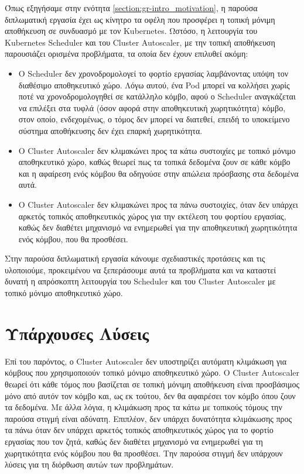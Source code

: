 Όπως εξηγήσαμε στην ενότητα \ref{section:gr-intro_motivation}, η παρούσα
διπλωματική εργασία έχει ως κίνητρο τα οφέλη που προσφέρει η τοπική μόνιμη αποθήκευση σε
συνδυασμό με τον Kubernetes. Ωστόσο, η λειτουργία του Kubernetes Scheduler και
του Cluster Autoscaler, με την τοπική αποθήκευση παρουσιάζει ορισμένα
προβλήματα, τα οποία δεν έχουν επιλυθεί ακόμη:
\begin{itemize}
      \tightlist
      \item Ο Scheduler δεν χρονοδρομολογεί το φορτίο εργασίας λαμβάνοντας υπόψη
            τον διαθέσιμο αποθηκευτικό χώρο. Λόγω αυτού, ένα Pod μπορεί να
            κολλήσει χωρίς ποτέ να χρονοδρομολογηθεί σε κατάλληλο κόμβο, αφού ο
            Scheduler αναγκάζεται να επιλέξει στα τυφλά (όσον αφορά στην
            αποθηκευτική χωρητικότητα) κόμβο, στον οποίο, ενδεχομένως, ο τόμος δεν
            μπορεί να διατεθεί, επειδή το υποκείμενο σύστημα αποθήκευσης δεν έχει
            επαρκή χωρητικότητα.
      \item Ο Cluster Autoscaler δεν κλιμακώνει προς τα κάτω συστοιχίες με
            τοπικό μόνιμο αποθηκευτικό χώρο, καθώς θεωρεί πως τα τοπικά δεδομένα
            ζουν σε κάθε κόμβο και η αφαίρεση ενός κόμβου θα οδηγούσε στην
            απώλεια πρόσβασης στα δεδομένα αυτά.
      \item Ο Cluster Autoscaler δεν κλιμακώνει προς τα πάνω συστοιχίες, όταν
            δεν υπάρχει αρκετός τοπικός αποθηκευτικός χώρος για την εκτέλεση του
            φορτίου εργασίας, καθώς δεν διαθέτει μηχανισμό να ενημερωθεί για την
            αποθηκευτική χωρητικότητα ενός κόμβου, που θα προσθέσει.
\end{itemize}

Στην παρούσα διπλωματική εργασία κάνουμε σχεδιαστικές προτάσεις και τις
υλοποιούμε, προκειμένου να ξεπεράσουμε αυτά τα προβλήματα και να καταστεί δυνατή
η απρόσκοπτη λειτουργία του Scheduler και του Cluster Autoscaler με
τοπικό μόνιμο αποθηκευτικό χώρο.

\section{Υπάρχουσες Λύσεις} \label{section:gr-intro_existing_solutions}

Επί του παρόντος, ο Cluster Autoscaler δεν υποστηρίζει αυτόματη κλιμάκωση για
κόμβους που χρησιμοποιούν τοπικό μόνιμο αποθηκευτικό χώρο. Ο Cluster Autoscaler
θεωρεί ότι κάθε τόμος που βασίζεται σε τοπική μόνιμη αποθήκευση είναι
προσβάσιμος μόνο από αυτόν τον κόμβο και, ως εκ τούτου, δεν θα αφαιρέσει τον
κόμβο όπου ζουν τα δεδομένα. Με άλλα λόγια, η κλιμάκωση προς τα κάτω με
τοπικούς τόμους την παρούσα στιγμή είναι αδύνατη. Επιπλέον, δεν υπάρχει
δυνατότητα κλιμάκωσης προς τα πάνω όταν δεν υπάρχει αρκετός τοπικός
αποθηκευτικός χώρος για το φορτίο εργασίας που τον ζητά, καθώς δεν διαθέτει
μηχανισμό να ενημερωθεί για τη χωρητικότητα ενός κόμβου που θα προσθέσει. Την
παρούσα στιγμή δεν υπάρχουν λύσεις για τη διόρθωση αυτών των προβλημάτων.

